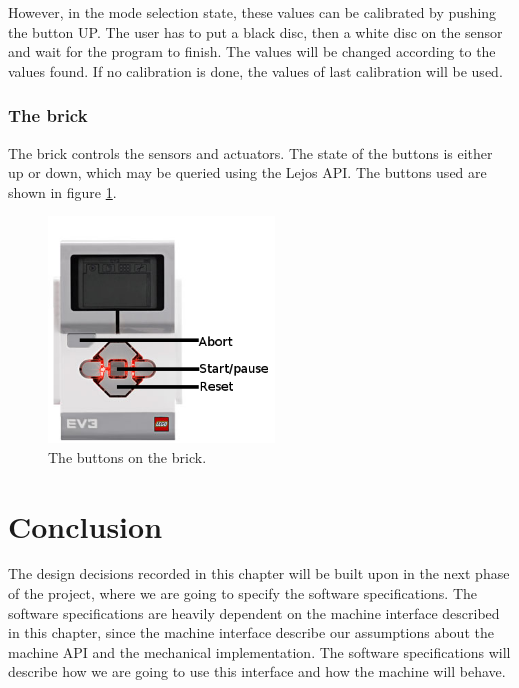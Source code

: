 \documentclass[a4paper,oneside,11pt]{article}
\begin{document}
However, in the mode selection state, these values can be calibrated by pushing the button UP. The user has to put a black disc, then a white disc on the sensor and wait for the program to finish. The values will be changed according to the values found. If no calibration is done, the values of last calibration will be used.

\subsubsection{The brick}
The brick controls the sensors and actuators. The state of the buttons is either
up or down, which may be queried using the Lejos API. The buttons used are shown in figure \ref{brickbuttons}.
\begin{figure}[H]
	\centering
	\includegraphics[width=60mm]{BrickButtons.png}
	\caption{\label{brickbuttons}The buttons on the brick.}
\end{figure}

\section{Conclusion}
The design decisions recorded in this chapter will be built upon in the next phase of the
project, where we are going to specify the software specifications. The software specifications
are heavily dependent on the machine interface described in this chapter, since the machine
interface describe our assumptions about the machine API and the mechanical implementation.
The software specifications will describe how we are going to use this interface and how the
machine will behave.
\end{document}
